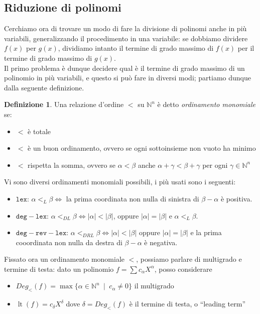 \documentclass[a4paper,10pt]{article}
\theoremstyle{plain}
\theoremstyle{definition}
\newtheorem{defn}{Definizione}[section]
\DeclareMathOperator{\lt}{lt}
\DeclareMathOperator{\st}{\; |\;}
\newcommand{\N}{\mathbb{N}}
\begin{document}
\subsection{Riduzione di polinomi}
Cerchiamo ora di trovare un modo di fare la divisione di polinomi anche in più variabili, generalizzando il procedimento in una variabile: se dobbiamo dividere $f(x)$ per $g(x)$, dividiamo intanto il termine di grado massimo di $f(x)$ per il termine di grado massimo di $g(x)$.\\
Il primo problema è dunque decidere qual è il termine di grado massimo di un polinomio in più variabili, e questo si può fare in diversi modi; partiamo dunque dalla seguente definizione.\\
\begin{defn}
    Una relazione d'ordine $<$ su $\N^n$ è detto \emph{ordinamento monomiale} se:
    \begin{itemize}
        \item $<$ è totale
        \item $<$ è un buon ordinamento, ovvero se ogni sottoinsieme non vuoto ha minimo
        \item $<$ rispetta la somma, ovvero se $\alpha<\beta$ anche $\alpha+\gamma<\beta+\gamma$ per ogni $\gamma\in\N^n$
    \end{itemize}
\end{defn}

Vi sono diversi ordinamenti monomiali possibili, i più usati sono i seguenti:
\begin{itemize}
    \item $\mathtt{lex}$: $\alpha<_{L}\beta\iff$ la prima coordinata non nulla di sinistra di $\beta-\alpha$ è positiva.
    \item $\mathtt{deg-lex}$: $\alpha<_{DL}\beta\iff|\alpha|<|\beta|$, oppure $|\alpha|=|\beta|$ e $\alpha<_L\beta$.
    \item $\mathtt{deg-rev-lex}$: $\alpha<_{DRL}\beta\iff|\alpha|<|\beta|$ oppure $|\alpha|=|\beta|$ e la prima cooordinata non nulla da destra di $\beta-\alpha$ è negativa.
\end{itemize}

Fissato ora un ordinamento monomiale $<$, possiamo parlare di multigrado e termine di testa: dato un polinomio $f=\sum c_\alpha X^\alpha$, posso considerare
\begin{itemize}
    \item $Deg_{<}(f)=\max\{ \alpha\in\N^n\st c_\alpha\neq0 \}$ il multigrado
    \item $\lt(f)=c_\delta X^\delta$ dove $\delta=Deg_{<}(f)$ è il termine di testa, o ``leading term''
\end{itemize}
\end{document}
